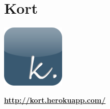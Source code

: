 \chapter{Kort}
\label{kort}

\begin{center}
\includegraphics[scale=0.8]{images/implementation/kort-icon_with_gloss}

{\large \textbf{\url{http://kort.herokuapp.com/}}}

\vspace{1cm}


\end{center}
